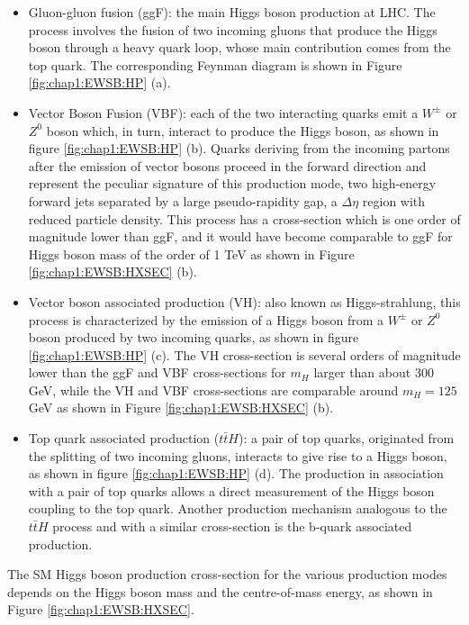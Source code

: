 \begin{itemize}
	\item Gluon-gluon fusion (ggF): the main Higgs boson production at LHC. The process involves the fusion of two incoming gluons that produce the Higgs boson through a heavy quark loop, whose main contribution comes from the top quark. The corresponding Feynman diagram is shown in Figure \ref{fig:chap1:EWSB:HP} (a).  
	\item Vector Boson Fusion (VBF): each of the two interacting quarks emit a $W^{\pm}$ or $Z^0$ boson which, in turn, interact to produce the Higgs boson, as shown in figure \ref{fig:chap1:EWSB:HP} (b). Quarks deriving from the incoming partons after the emission of vector bosons proceed in the forward direction and represent the peculiar signature of this production mode, two high-energy forward jets separated by a large pseudo-rapidity gap, a $\Delta\eta$ region with reduced particle density. This process has a cross-section which is one order of magnitude lower than ggF, and it would have become comparable to ggF for Higgs boson mass of the order of 1 TeV as shown in Figure \ref{fig:chap1:EWSB:HXSEC} (b).
	\item Vector boson associated production (VH): also known as Higgs-strahlung, this process is characterized by the emission of a Higgs boson from a $W^{\pm}$ or $Z^0$ boson produced by two incoming quarks, as shown in figure \ref{fig:chap1:EWSB:HP} (c). The VH cross-section is several orders of magnitude lower than the ggF and VBF cross-sections for $m_H$ larger than about 300 GeV, while the VH and VBF cross-sections are comparable around $m_H = 125$ GeV as shown in Figure \ref{fig:chap1:EWSB:HXSEC} (b).
	\item Top quark associated production ($t\bar{t}H$): a pair of top quarks, originated from the splitting of two incoming gluons, interacts to give rise to a Higgs boson, as shown in figure \ref{fig:chap1:EWSB:HP} (d). The production in association with a pair of top quarks allows a direct measurement of the Higgs boson coupling to the top quark. Another production mechanism analogous to the $t\bar{t}H$ process and with a similar cross-section is the b-quark associated production.
\end{itemize}
The SM Higgs boson production cross-section for the various production modes depends on the Higgs boson mass and the centre-of-mass energy, as shown in Figure \ref{fig:chap1:EWSB:HXSEC}. 
